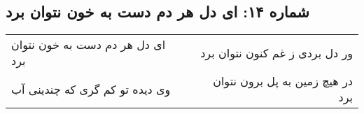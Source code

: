 \begin{center}
\section*{شماره ۱۴: ای دل هر دم دست به خون نتوان برد}
\label{sec:014}
\begin{longtable}{l p{0.5cm} r}
ای دل هر دم دست به خون نتوان برد
&&
ور دل بردی ز غم کنون نتوان برد
\\
وی دیده تو کم گری که چندینی آب
&&
در هیچ زمین به پل برون نتوان برد
\\
\end{longtable}
\end{center}
